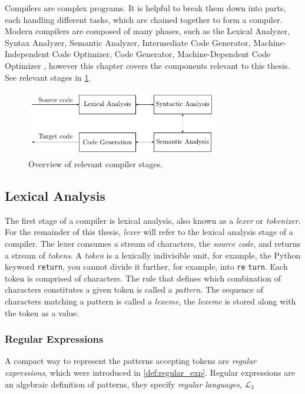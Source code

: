 Compilers are complex programs. It is helpful to break them down into parts, each handling different tasks, which are chained together to form a compiler. Modern compilers are composed of many phases, such as the Lexical Analyzer, Syntax Analyzer, Semantic Analyzer, Intermediate Code Generator, Machine-Independent Code Optimizer, Code Generator, Machine-Dependent Code Optimizer \cite[p. 5]{dragon}, however this chapter covers the components relevant to this thesis. See relevant stages in \cref{fig:compiler-stages}.


\begin{figure}[h]
 
  \label{fig:compiler-stages}
  \centering
  \includegraphics[width=0.75\textwidth]{figures/compiler-stages.pdf}
  \caption{Overview of relevant compiler stages.}
\end{figure}

\subsection*{Lexical Analysis}
The first stage of a compiler is lexical analysis, also known as a \emph{lexer} or \emph{tokenizer}. For the remainder of this thesis, \emph{lexer} will refer to the lexical analysis stage of a compiler. The lexer consumes a stream of characters, the \emph{source code}, and returns a stream of \emph{tokens}. A \emph{token} is a lexically indivisible unit, for example, the Python keyword \texttt{return}, you cannot divide it further, for example, into \texttt{re} \texttt{turn}. Each token is comprised of characters. The rule that defines which combination of characters constitutes a given token is called a \emph{pattern}. The sequence of characters matching a pattern is called a \emph{lexeme}, the \emph{lexeme} is stored along with the token as a value.



\subsubsection*{Regular Expressions}
A compact way to represent the patterns accepting tokens are \emph{regular expressions}, which were introduced in \cref{def:regular_exp}. Regular expressions are an algebraic definition of patterns, they specify \emph{regular languages}, $\mathcal{L}_3$

